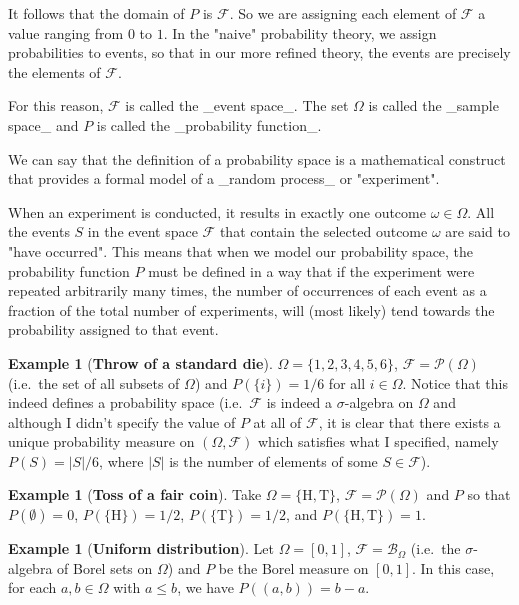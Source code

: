 \documentclass{article}
\theoremstyle{definition}
\newtheorem{example}[theorem]{Example}
\begin{document}
It follows that the domain of $P$ is $\mathcal{F}$. So we are assigning each element of $\mathcal{F}$ a value
ranging from $0$ to $1$. In the "naive" probability theory, we assign probabilities to events, so that in our
more refined theory, the events are precisely the elements of $\mathcal{F}$.

For this reason, $\mathcal{F}$ is called the _event space_. The set $\Omega$ is called the _sample space_
and $P$ is called the _probability function_.

We can say that the definition of a probability space is a mathematical construct that provides a formal model
of a _random process_ or "experiment".

When an experiment is conducted, it results in exactly one outcome $\omega \in \Omega$. All the events $S$ in the event space
$\mathcal{F}$ that contain the selected outcome $\omega$ are said to "have occurred". This means that when we model our
probability space, the probability function $P$ must be defined in a way that if the experiment were repeated arbitrarily
many times, the number of occurrences of each event as a fraction of the total number of experiments, will (most likely)
tend towards the probability assigned to that event.

\begin{example}[\textbf{Throw of a standard die}]
    $\Omega = \{1, 2, 3, 4, 5, 6\}$, $\mathcal{F} = \mathcal{P}(\Omega)$
    (i.e.\ the set of all subsets of $\Omega$) and $P(\{ i \}) = 1/6$ for all $i \in \Omega$. Notice that
    this indeed defines a probability space (i.e.\ $\mathcal{F}$ is indeed a $\sigma$-algebra on $\Omega$ and although
    I didn't specify the value of $P$ at all of $\mathcal{F}$, it is clear that there exists a unique probability measure
    on $(\Omega, \mathcal{F})$ which satisfies what I specified, namely $P(S) = |S|/6$, where $|S|$ is the number of elements
    of some $S \in \mathcal{F}$).
\end{example}

\begin{example}[\textbf{Toss of a fair coin}]
    Take $\Omega = \{ \text{H}, \text{T} \}$, $\mathcal{F} = \mathcal{P}(\Omega)$ and $P$
    so that $P(\emptyset) = 0$, $P(\{ \text{H} \}) = 1/2$, $P(\{ \text{T} \}) = 1/2$, and $P(\{ \text{H}, \text{T} \}) = 1$.
\end{example}

\begin{example}[\textbf{Uniform distribution}]
    Let $\Omega = [0, 1]$, $\mathcal{F} = \mathcal{B}_{\Omega}$ (i.e.\ the $\sigma$-algebra
    of Borel sets on $\Omega$) and $P$ be the Borel measure on $[0, 1]$. In this case, for each $a, b \in \Omega$ with $a \leq b$,
    we have $P((a, b)) = b - a$.
\end{example}
\end{document}
